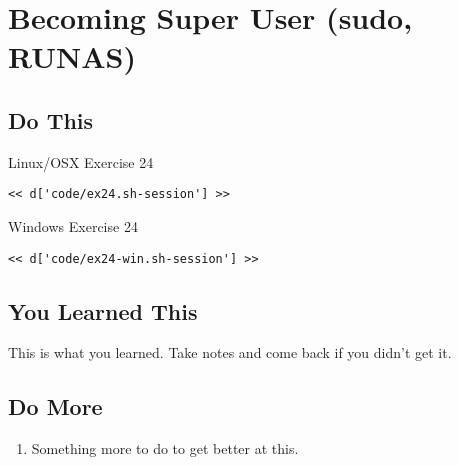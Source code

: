 \chapter{Becoming Super User (sudo, RUNAS)}

\section{Do This}

\begin{code}{Linux/OSX Exercise 24}
\begin{Verbatim}
<< d['code/ex24.sh-session'] >>
\end{Verbatim}
\end{code}

\begin{code}{Windows Exercise 24}
\begin{Verbatim}
<< d['code/ex24-win.sh-session'] >>
\end{Verbatim}
\end{code}

\section{You Learned This}

This is what you learned.  Take notes and come back if you didn't get it.

\section{Do More}

\begin{enumerate}
\item Something more to do to get better at this.
\end{enumerate}


